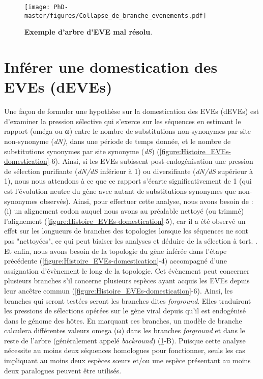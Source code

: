 \begin{figure}[!htpb]
\captionsetup{font=footnotesize}
 \centering
  \texttt{[image: PhD-master/figures/Collapse\_de\_branche\_evenements.pdf]}
\caption[Methode:Exemple d'arbre d'EVE mal résolu]{\textbf{Exemple d'arbre d'EVE mal résolu}.}
\label{figure:Collapse_de_branche_evenements}
\end{figure}


\section{Inférer une domestication des EVEs (dEVEs)}

Une façon de formuler une hypothèse sur la domestication des EVEs (dEVEs) est d'examiner la pression sélective qui s'exerce sur les séquences en estimant le rapport (oméga ou ω) entre le nombre de substitutions non-synonymes par site non-synonyme (\textit{dN)}, dans une période de temps donnée, et le nombre de substitutions synonymes par site synonyme (\textit{dS}) (\figurename{\ref{figure:Histoire_EVEs-domestication}}-6). Ainsi, si les EVEs subissent post-endogénisation une pression de sélection purifiante (\textit{dN/dS} inférieur à 1) ou diversifiante (\textit{dN/dS} supérieur à 1), nous nous attendons à ce que ce rapport s'écarte significativement de 1 (qui est l'évolution neutre du gène avec autant de substitutions synonymes que non-synonymes observés). Ainsi, pour effectuer cette analyse, nous avons besoin de : (i) un alignement codon auquel nous avons au préalable nettoyé (ou trimmé) l'alignement (\figurename{\ref{figure:Histoire_EVEs-domestication}}-5), car il a été observé un effet sur les longueurs de branches des topologies lorsque les séquences ne sont pas "nettoyées", ce qui peut biaiser les analyses et déduire de la sélection à tort. \citep{ranwez_chapter_2020,tan_current_2015}. Et enfin, nous avons besoin de la topologie du gène inférée dans l'étape précédente (\figurename{\ref{figure:Histoire_EVEs-domestication}}-4) accompagné d'une assignation d'évènement le long de la topologie. Cet évènement peut concerner plusieurs branches s'il concerne plusieurs espèces ayant acquis les EVEs depuis leur ancêtre commun (\figurename{\ref{figure:Histoire_EVEs-domestication}}-6). Ainsi, les branches qui seront testées seront les branches dites \textit{forground}. Elles traduiront les pressions de sélections opérées sur le gène viral depuis qu'il est endogénisé dans le génome des hôtes. En marquant ces branches, un modèle de branche calculera différentes valeurs omega (ω) dans les branches \textit{forground} et dans le reste de l'arbre (généralement appelé \textit{backround}) (\figurename{\ref{figure:Collapse_de_branche_evenements}}-B). Puisque cette analyse nécessite au moins deux séquences homologues pour fonctionner, seuls les cas impliquant au moins deux espèces sœurs et/ou une espèce présentant au moins deux paralogues peuvent être utilisés.
